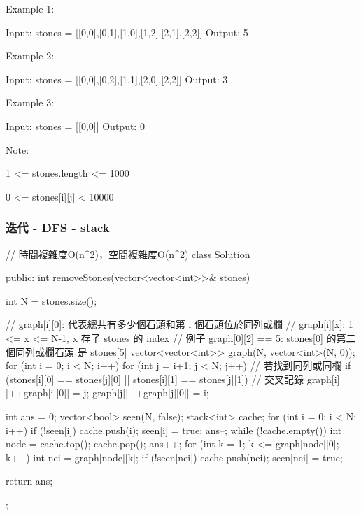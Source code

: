 Example 1:
\begin{Code}
Input: stones = [[0,0],[0,1],[1,0],[1,2],[2,1],[2,2]]
Output: 5
\end{Code}

Example 2:
\begin{Code}
Input: stones = [[0,0],[0,2],[1,1],[2,0],[2,2]]
Output: 3
\end{Code}

Example 3:
\begin{Code}
Input: stones = [[0,0]]
Output: 0
\end{Code}

Note:
\begindot
\item 1 <= stones.length <= 1000
\item 0 <= stones[i][j] < 10000
\myenddot

\subsubsection{迭代 - DFS - stack}
\begin{Code}
// 時間複雜度O(n^2)，空間複雜度O(n^2)
class Solution {
public:
    int removeStones(vector<vector<int>>& stones) {
        int N = stones.size();

        // graph[i][0]: 代表總共有多少個石頭和第 i 個石頭位於同列或欄
        // graph[i][x]: 1 <= x <= N-1, x 存了 stones 的 index
        // 例子 graph[0][2] == 5: stones[0] 的第二個同列或欄石頭 是 stones[5]
        vector<vector<int>> graph(N, vector<int>(N, 0));
        for (int i = 0; i < N; i++)
        {
            for (int j = i+1; j < N; j++)
            {
                // 若找到同列或同欄
                if (stones[i][0] == stones[j][0]
                   || stones[i][1] == stones[j][1])
                {
                    // 交叉記錄
                    graph[i][++graph[i][0]] = j;
                    graph[j][++graph[j][0]] = i;
                }
            }
        }

        int ans = 0;
        vector<bool> seen(N, false);
        stack<int> cache;
        for (int i = 0; i < N; i++)
        {
            if (!seen[i])
            {
                cache.push(i);
                seen[i] = true;
                ans--;
                while (!cache.empty())
                {
                    int node = cache.top();
                    cache.pop();
                    ans++;
                    for (int k = 1; k <= graph[node][0]; k++)
                    {
                        int nei = graph[node][k];
                        if (!seen[nei])
                        {
                            cache.push(nei);
                            seen[nei] = true;
                        }
                    }
                }
            }
        }

        return ans;
    }
};
\end{Code}

